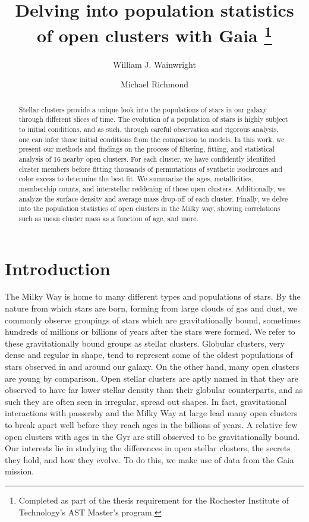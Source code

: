 \documentclass[onecolumn,table,xcdraw,super]{aastex631}
\begin{document}
\title{Delving into population statistics of open clusters with Gaia
\footnote{Completed as part of the thesis requirement for the Rochester Institute of Technology's AST Master's program.}}

\author{William J. Wainwright}

\author[0000-0002-7676-8302]{Michael Richmond}
\begin{abstract}

Stellar clusters provide a unique look into the populations of stars in our galaxy through different slices of time. The evolution of a population of stars is highly subject to initial conditions, and as such, through careful observation and rigorous analysis, one can infer those initial conditions from the comparison to models. In this work, we present our methods and findings on the process of filtering, fitting, and statistical analysis of 16 nearby open clusters. For each cluster, we have confidently identified cluster members before fitting thousands of permutations of synthetic isochrones and color excess to determine the best fit. We summarize the ages, metallicities, membership counts, and interstellar reddening of these open clusters. Additionally, we analyze the surface density and average mass drop-off of each cluster. Finally, we delve into the population statistics of open clusters in the Milky way, showing correlations such as mean cluster mass as a function of age, and more.



\end{abstract}

\newpage
\tableofcontents
\newpage

\section{Introduction} \label{sec:intro}

The Milky Way is home to many different types and populations of stars. By the nature from which stars are born, forming from large clouds of gas and dust, we commonly observe groupings of stars which are gravitationally bound, sometimes hundreds of millions or billions of years after the stars were formed. We refer to these gravitationally bound groups as stellar clusters. Globular clusters, very dense and regular in shape, tend to represent some of the oldest populations of stars observed in and around our galaxy. On the other hand, many open clusters are young by comparison. Open stellar clusters are aptly named in that they are observed to have far lower stellar density than their globular counterparts, and as such they are often seen in irregular, spread out shapes. In fact, gravitational interactions with passersby and the Milky Way at large lead many open clusters to break apart well before they reach ages in the billions of years. A relative few open clusters with ages in the Gyr are still observed to be gravitationally bound. Our interests lie in studying the differences in open stellar clusters, the secrets they hold, and how they evolve. To do this, we make use of data from the Gaia mission.
\end{document}

